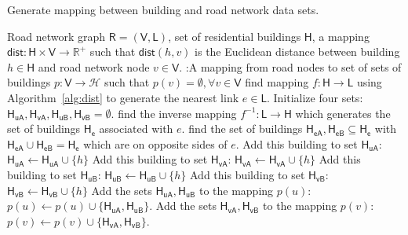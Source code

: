 \begin{algorithm}[H]
	\caption{Generate mapping between building and road network data sets.}
	\label{alg:map1}
	\begin{algorithmic}[1]
		\Require Road network graph $\mathsf{R=(\mathsf{V},\mathsf{L})}$, set of residential buildings $\mathsf{H}$, a mapping $\mathsf{dist}:\mathsf{H}\times\mathsf{V}\rightarrow\mathbb{R}^{+}$ such that $\mathsf{dist}(h,v)$ is the Euclidean distance between building $h\in\mathsf{H}$ and road network node $v\in\mathsf{V}$.
		\Initialize :A mapping from road nodes to set of sets of buildings $p:\mathsf{V}\rightarrow\mathcal{H}$ such that $p(v)=\emptyset,\forall v\in\mathsf{V}$
		\State find mapping $f:\mathsf{H}\rightarrow\mathsf{L}$ using Algorithm~\ref{alg:dist} to generate the nearest link $e\in\mathsf{L}$.
		\EndFor
		\State Initialize four sets: $\mathsf{H_{uA}},\mathsf{H_{vA}},\mathsf{H_{uB}},\mathsf{H_{vB}}=\emptyset$.
		\State find the inverse mapping $f^{-1}:\mathsf{L}\rightarrow\mathsf{H}$ which generates the set of buildings $\mathsf{H_e}$ associated with $e$.
		\State find the set of buildings $\mathsf{H_{eA}},\mathsf{H_{eB}}\subseteq\mathsf{H_e}$ with $\mathsf{H_{eA}}\cup\mathsf{H_{eB}}=\mathsf{H_e}$ which are on opposite sides of $e$.
		\State Add this building to set $\mathsf{H_{uA}}$: $\mathsf{H_{uA}}\leftarrow\mathsf{H_{uA}}\cup\{h\}$
		\Else
		\State Add this building to set $\mathsf{H_{vA}}$: $\mathsf{H_{vA}}\leftarrow\mathsf{H_{vA}}\cup\{h\}$
		\EndIf
		\EndFor
		\State Add this building to set $\mathsf{H_{uB}}$: $\mathsf{H_{uB}}\leftarrow\mathsf{H_{uB}}\cup\{h\}$
		\Else
		\State Add this building to set $\mathsf{H_{vB}}$: $\mathsf{H_{vB}}\leftarrow\mathsf{H_{vB}}\cup\{h\}$
		\EndIf
		\EndFor
		\State Add the sets $\mathsf{H_{uA}},\mathsf{H_{uB}}$ to the mapping $p(u)$: $p(u)\leftarrow p(u)\cup\{\mathsf{H_{uA}},\mathsf{H_{uB}}\}$.
		\State Add the sets $\mathsf{H_{vA}},\mathsf{H_{vB}}$ to the mapping $p(v)$: $p(v)\leftarrow p(v)\cup\{\mathsf{H_{vA}},\mathsf{H_{vB}}\}$.
		\EndFor
	\end{algorithmic}
\end{algorithm}

